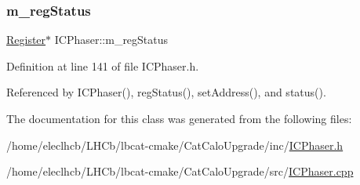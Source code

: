 \mbox{\label{classICPhaser_adcc37517abf1390407003c387008262d}} 
\subsubsection{\texorpdfstring{m\+\_\+reg\+Status}{m\_regStatus}}
{\footnotesize\ttfamily \hyperlink{classRegister}{Register}$\ast$ I\+C\+Phaser\+::m\+\_\+reg\+Status\hspace{0.3cm}{\ttfamily [private]}}



Definition at line 141 of file I\+C\+Phaser.\+h.



Referenced by I\+C\+Phaser(), reg\+Status(), set\+Address(), and status().



The documentation for this class was generated from the following files\+:\begin{DoxyCompactItemize}
\item 
/home/eleclhcb/\+L\+H\+Cb/lbcat-\/cmake/\+Cat\+Calo\+Upgrade/inc/\hyperlink{ICPhaser_8h}{I\+C\+Phaser.\+h}\item 
/home/eleclhcb/\+L\+H\+Cb/lbcat-\/cmake/\+Cat\+Calo\+Upgrade/src/\hyperlink{ICPhaser_8cpp}{I\+C\+Phaser.\+cpp}\end{DoxyCompactItemize}
